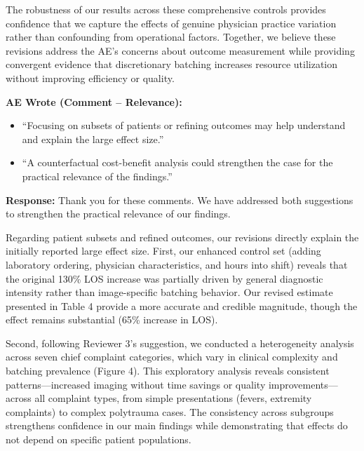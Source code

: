\documentclass[11pt]{article}
\newenvironment{quote2}
{ \bigskip
\noindent
         \small\em
         \baselineskip=14pt
}
\newcommand{\1}{\hbox{\rm 1\kern-.35em 1}}
\begin{document}
The robustness of our results across these comprehensive controls provides confidence that we capture the effects of genuine physician practice variation rather than confounding from operational factors. Together, we believe these revisions address the AE's concerns about outcome measurement while providing convergent evidence that discretionary batching increases resource utilization without improving efficiency or quality.

\color{black}

\begin{quote2}
\textbf{AE Wrote (Comment – Relevance):} 

\begin{itemize}
    \item ``Focusing on subsets of patients or refining outcomes may help understand and explain the large effect size.''
    \item ``A counterfactual cost-benefit analysis could strengthen the case for the practical relevance of the findings.'' 
\end{itemize}

\end{quote2}

\noindent\textbf{Response:} \color{blue}Thank you for these comments. We have addressed both suggestions to strengthen the practical relevance of our findings.

Regarding patient subsets and refined outcomes, our revisions directly explain the initially reported large effect size. First, our enhanced control set (adding laboratory ordering, physician characteristics, and hours into shift) reveals that the original 130\% LOS increase was partially driven by general diagnostic intensity rather than image-specific batching behavior. Our revised estimate presented in Table 4 provide a more accurate and credible magnitude, though the effect remains substantial (65\% increase in LOS).

Second, following Reviewer 3's suggestion, we conducted a heterogeneity analysis across seven chief complaint categories, which vary in clinical complexity and batching prevalence (Figure 4). This exploratory analysis reveals consistent patterns—increased imaging without time savings or quality improvements—across all complaint types, from simple presentations (fevers, extremity complaints) to complex polytrauma cases. The consistency across subgroups strengthens confidence in our main findings while demonstrating that effects do not depend on specific patient populations.
\end{document}
